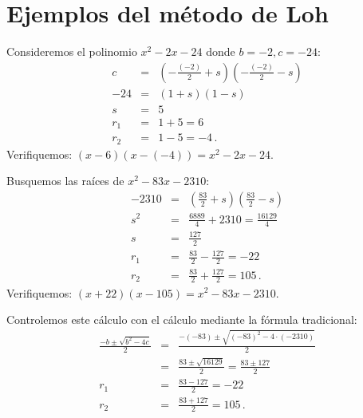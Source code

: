 \section{Ejemplos del método de Loh}\label{s.examples}

\begin{example}
Consideremos el polinomio $x^2-2x-24$ donde $b=-2,c=-24$:
\begin{eqnarray*}
c&=&\left(-\frac{(-2)}{2} +s\right)\left(-\frac{(-2)}{2} -s\right)\\
-24&=&(1 +s)(1 -s)\\
s&=&5\\
r_1&=&1+5=6\\
r_2&=&1-5=-4\,.
\end{eqnarray*}
Verifiquemos: $(x-6)(x-(-4))= x^2-2x-24$.
\end{example}

\begin{example}
Busquemos las raíces de $x^2-83x-2310$:
\begin{eqnarray*}
-2310&=&\left(\frac{83}{2}+s\right)\left(\frac{83}{2} -s\right)\\
s^2&=&\frac{6889}{4}+2310=\frac{16129}{4}\\
s&=&\frac{127}{2}\\
r_1&=&\frac{83}{2}-\frac{127}{2}=-22\\
r_2&=&\frac{83}{2}+\frac{127}{2}=105\,.
\end{eqnarray*}
Verifiquemos: $(x+22)(x-105)= x^2-83x-2310$.

Controlemos este cálculo con el cálculo mediante la fórmula tradicional:
\begin{eqnarray*}
\frac{-b\pm\sqrt{b^2-4c}}{2}&=&\frac{-(-83)\pm\sqrt{(-83)^2-4\cdot (-2310)}}{2}\\
&=& \frac{83\pm\sqrt{16129}}{2} = \frac{83\pm 127}{2}\\
r_1&=&\frac{83-127}{2}=-22\\
r_2&=&\frac{83+127}{2}=105\,.
\end{eqnarray*}
\end{example}

